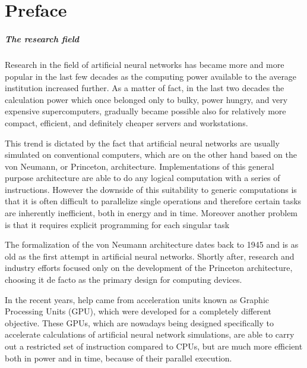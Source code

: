 \chapter*{Preface}

\paragraph{The research field\\}
Research in the field of artificial neural networks has became more and more popular in the last few decades as the computing power available to the average institution increased further.
As a matter of fact, in the last two decades the calculation power which once belonged only to bulky, power hungry, and very expensive supercomputers, gradually became possible also for relatively more compact, efficient, and definitely cheaper servers and workstations.

This trend is dictated by the fact that artificial neural networks are usually simulated on conventional computers, which are on the other hand based on the von Neumann, or Princeton, architecture.
Implementations of this general purpose architecture are able to do any logical computation with a series of instructions.
However the downside of this suitability to generic computations is that it is often difficult to parallelize single operations and therefore certain tasks are inherently inefficient, both in energy and in time.
Moreover another problem is that it requires explicit programming for each singular task

The formalization of the von Neumann architecture dates back to 1945 and is as old as the first attempt in artificial neural networks.
Shortly after, research and industry efforts focused only on the development of the Princeton architecture, choosing it de facto as the primary design for computing devices.

In the recent years, help came from acceleration units known as Graphic Processing Units (GPU), which were developed for a completely different objective.
These GPUs, which are nowadays being designed specifically to accelerate calculations of artificial neural network simulations, are able to carry out a restricted set of instruction compared to CPUs, but are much more efficient both in power and in time, because of their parallel execution.

